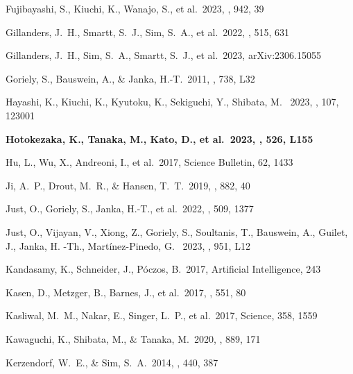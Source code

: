 \documentclass[twocolumn,twocolappendix]{aastex63}
\begin{document}
{{\begin{thebibliography}{}
 Fujibayashi, S., Kiuchi, K., Wanajo, S., et al.\ 2023, \apj, 942, 39


 Gillanders, J.~H., Smartt, S.~J., Sim, S.~A., et al.\ 2022, \mnras, 515, 631


 Gillanders, J.~H., Sim, S.~A., Smartt, S.~J., et al.\ 2023, arXiv:2306.15055


 Goriely, S., Bauswein, A., \& Janka, H.-T.\ 2011, \apjl, 738, L32


 Hayashi, K., Kiuchi, K., Kyutoku, K., Sekiguchi, Y., Shibata, M. \ 2023, \prd, 107, 123001


 \textbf{Hotokezaka, K., Tanaka, M., Kato, D., et al.\ 2023, \mnras, 526, L155}


 Hu, L., Wu, X., Andreoni, I., et al.\ 2017, Science Bulletin, 62, 1433


 Ji, A.~P., Drout, M.~R., \& Hansen, T.~T.\ 2019, \apj, 882, 40


 Just, O., Goriely, S., Janka, H.-T., et al.\ 2022, \mnras, 509, 1377

 Just, O., Vijayan, V., Xiong, Z., Goriely, S., Soultanis, T., Bauswein, A., Guilet, J., Janka, H. -Th., Martínez-Pinedo, G. \ 2023, \apjl, 951, L12


 Kandasamy, K., Schneider, J., P{\'o}czos, B.\ 2017, Artificial Intelligence, 243


 Kasen, D., Metzger, B., Barnes, J., et al.\ 2017, \nat, 551, 80


 Kasliwal, M.~M., Nakar, E., Singer, L.~P., et al.\ 2017, Science, 358, 1559


 Kawaguchi, K., Shibata, M., \& Tanaka, M.\ 2020, \apj, 889, 171


 Kerzendorf, W.~E., \& Sim, S.~A.\ 2014, \mnras, 440, 387



\end{thebibliography}}}
\end{document}
